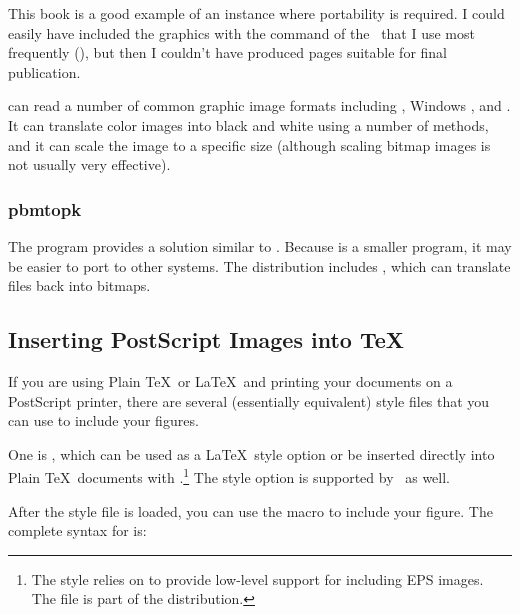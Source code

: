 This book is a good example of an instance
where portability is required.  I could easily have included the
graphics with the  command of the \dvidriver\ that I
use most frequently (), but then I couldn't have 
produced pages suitable
for final publication.

 can read a number of common graphic image formats
including , 
Windows , 
and .  It can
translate color images into black and white using a number of
 methods, and it can scale the image to a specific size
(although scaling bitmap images is not usually very effective).

\subsubsection{pbmtopk}

The  program provides a solution similar to
.  Because  is 
a smaller program, it may be
easier to port to other systems.  The  distribution includes
, which can translate  files 
back into  bitmaps.

\subsection{Inserting PostScript Images into \protect\TeX}
\label{sec:incps}

If you are using Plain \TeX\ or \LaTeX\ and printing your documents
on a PostScript printer, there 
are several (essentially equivalent) 
style files that you can use to include your figures.

One is , which 
can be used as a \LaTeX\
style option or be inserted directly into Plain \TeX\ documents with
\cs{input}.\footnote{The \filename{epsfig.sty} style relies on 
 to 
provide low-level support for including EPS 
images.  The  file is part of the  
distribution.}  
The  style option is supported by 
\LaTeXe\ as well.

After the style file is loaded, you can use the macro 
to include your figure.  The complete syntax for \cs{epsfig} is:

